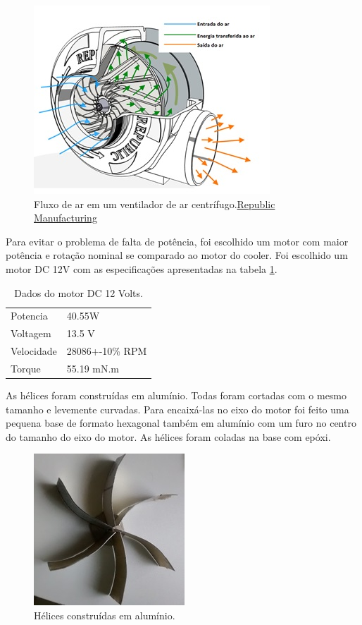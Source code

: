 		\begin{figure}[H]
			\centering
			\includegraphics[scale=1]{figuras/asppc2_6.jpg}
			\caption{Fluxo de ar em um ventilador de ar centrífugo.\href{https://www.republic-mfg.com/blowers/republic-centrifugal-blower.asp}{Republic Manufacturing}}
			\label{img:fluxo_de_ar_ventilador_centrífugo}
		\end{figure}

		Para evitar o problema de falta de potência, foi escolhido um motor com maior potência e rotação nominal se comparado ao motor do cooler. Foi escolhido um motor DC 12V com as especificações apresentadas na tabela \ref{tab:motor_12V}.

		\begin{table}[H]
			\centering
			\caption{Dados do motor DC 12 Volts.}
			\label{tab:motor_12V}
			\begin{tabular}{ll}
				Potencia   & 40.55W          \\
				Voltagem   & 13.5 V          \\
				Velocidade & 28086+-10\% RPM \\
				Torque     & 55.19 mN.m     
			\end{tabular}
		\end{table}

		As hélices foram construídas em alumínio. Todas foram cortadas com o mesmo tamanho e levemente curvadas. Para encaixá-las no eixo do motor foi feito uma pequena base de formato hexagonal também em alumínio com um furo no centro do tamanho do eixo do motor. As hélices foram coladas na base com epóxi.

		\begin{figure}[H]
			\centering
			\includegraphics[scale=1]{figuras/asppc2_7.jpg}
			\caption{Hélices construídas em alumínio.}
			\label{img:hélices_alumínio}
		\end{figure}

